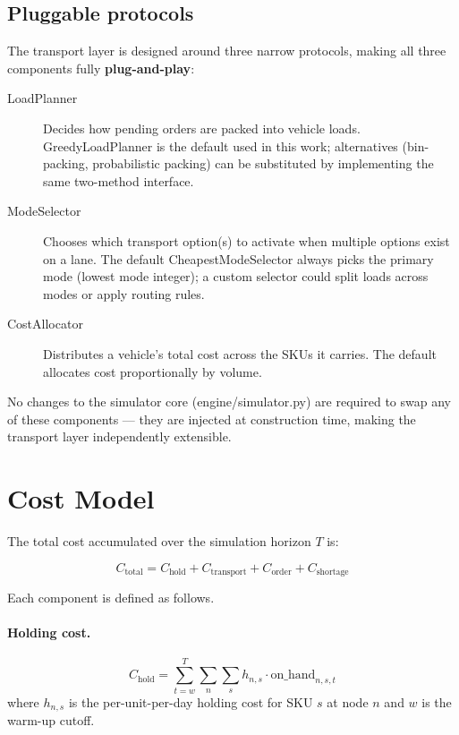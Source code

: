 \subsection{Pluggable protocols}

The transport layer is designed around three narrow protocols, making all
three components fully \textbf{plug-and-play}:

\begin{description}
  \item[LoadPlanner] Decides how pending orders are packed into
        vehicle loads.  GreedyLoadPlanner is the default used in
        this work; alternatives (bin-packing, probabilistic packing) can be
        substituted by implementing the same two-method interface.
  \item[ModeSelector] Chooses which transport option(s) to activate
        when multiple options exist on a lane.  The default
        CheapestModeSelector always picks the primary mode
        (lowest mode integer); a custom selector could split loads
        across modes or apply routing rules.
  \item[CostAllocator] Distributes a vehicle's total cost across the
        SKUs it carries.  The default allocates cost proportionally by volume.
\end{description}

No changes to the simulator core (engine/simulator.py) are required
to swap any of these components — they are injected at construction time,
making the transport layer independently extensible.

\section{Cost Model}
\label{sec:arch:cost}

The total cost accumulated over the simulation horizon $T$ is:

\begin{equation}
  C_{\text{total}} = C_{\text{hold}} + C_{\text{transport}}
                   + C_{\text{order}} + C_{\text{shortage}}
  \label{eq:total_cost}
\end{equation}

Each component is defined as follows.

\paragraph{Holding cost.}
\begin{equation}
  C_{\text{hold}} = \sum_{t=w}^{T} \sum_{n} \sum_{s}
    h_{n,s} \cdot \text{on\_hand}_{n,s,t}
\end{equation}
where $h_{n,s}$ is the per-unit-per-day holding cost for SKU $s$ at node $n$
and $w$ is the warm-up cutoff.

